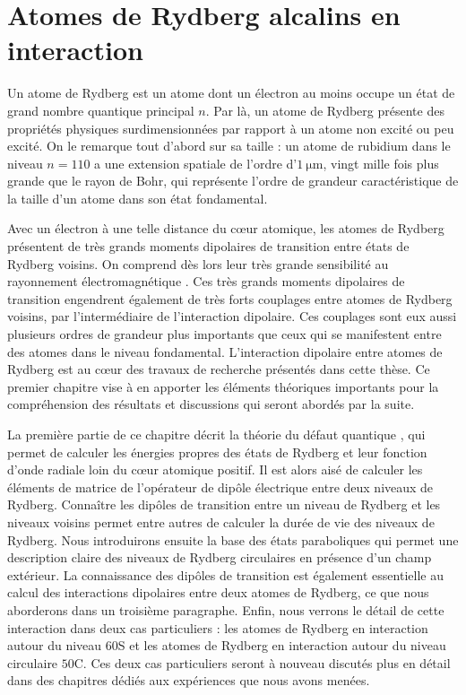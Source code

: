 \chapter{Atomes de Rydberg alcalins en interaction}
\label{chapter:Rydberg}

Un atome de Rydberg est un atome dont un électron au moins occupe un état de grand nombre quantique principal $n$.
Par là, un atome de Rydberg présente des propriétés physiques surdimensionnées par rapport à un atome non excité ou peu excité.
On le remarque tout d'abord sur sa taille : un atome de rubidium dans le niveau $n=110$ a une extension spatiale de l'ordre d'$1 ~\si{\micro\meter}$, vingt mille fois plus grande que le rayon de Bohr, qui représente l'ordre de grandeur caractéristique de la taille d'un atome dans son état fondamental.

Avec un électron à une telle distance du c\oe ur atomique, les atomes de Rydberg présentent de très grands moments dipolaires de transition entre états de Rydberg voisins. On comprend dès lors leur très grande sensibilité au rayonnement électromagnétique \cite{ENS_ENHANCED}.
Ces très grands moments dipolaires de transition engendrent également de très forts couplages entre atomes de Rydberg voisins, par l'intermédiaire de l'interaction dipolaire. Ces couplages sont eux aussi plusieurs ordres de grandeur plus importants que ceux qui se manifestent entre des atomes dans le niveau fondamental.
L'interaction dipolaire entre atomes de Rydberg est au c\oe ur des travaux de recherche présentés dans cette thèse. Ce premier chapitre vise à en apporter les éléments théoriques importants pour la compréhension des résultats et discussions qui seront abordés par la suite.

La première partie de ce chapitre décrit la théorie du défaut quantique \cite{TXT_GALLAGHER}, qui permet de calculer les énergies propres des états de Rydberg et leur fonction d'onde radiale loin du c\oe ur atomique positif.
Il est alors aisé de calculer les éléments de matrice de l'opérateur de dipôle électrique entre deux niveaux de Rydberg.
Connaître les dipôles de transition entre un niveau de Rydberg et les niveaux voisins permet entre autres de calculer la durée de vie des niveaux de Rydberg.
Nous introduirons ensuite la base des états paraboliques qui permet une description claire des niveaux de Rydberg circulaires en présence d'un champ extérieur.
La connaissance des dipôles de transition est également essentielle au calcul des interactions dipolaires entre deux atomes de Rydberg, ce que nous aborderons dans un troisième paragraphe.
Enfin, nous verrons le détail de cette interaction dans deux cas particuliers  : les atomes de Rydberg en interaction autour du niveau $60$S et les atomes de Rydberg en interaction autour du niveau circulaire $50$C.
Ces deux cas particuliers seront à nouveau discutés plus en détail dans des chapitres dédiés aux expériences que nous avons menées.


